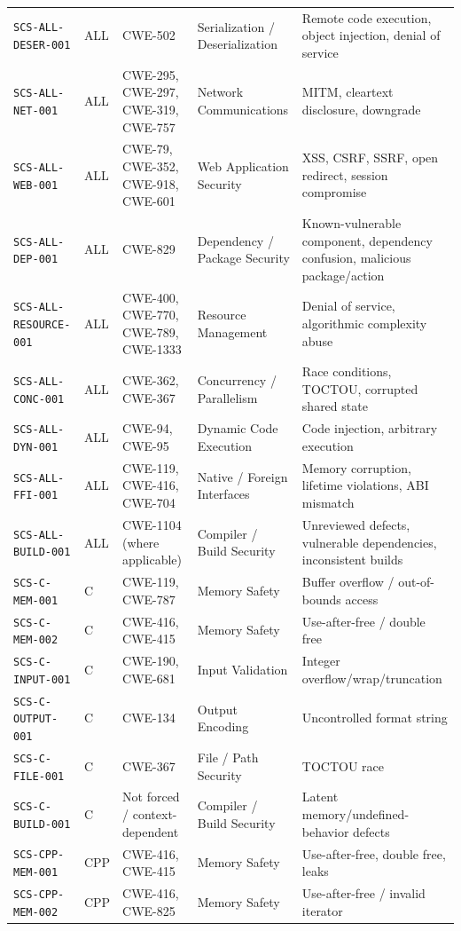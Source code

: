 \documentclass[10pt,letterpaper]{article}
\newcommand{\code}[1]{\begingroup\small\ttfamily\def\UrlFont{\ttfamily}\nolinkurl{#1}\endgroup}
\begin{document}
\begin{landscape}
\begin{longtable}{@{}P{1.3in}P{0.7in}P{1.4in}P{1.8in}P{3.8in}@{}}
\code{SCS-ALL-DESER-001} & ALL & CWE-502 & Serialization / Deserialization & Remote code execution, object injection, denial of service\\
\code{SCS-ALL-NET-001} & ALL & CWE-295, CWE-297, CWE-319, CWE-757 & Network Communications & MITM, cleartext disclosure, downgrade\\
\code{SCS-ALL-WEB-001} & ALL & CWE-79, CWE-352, CWE-918, CWE-601 & Web Application Security & XSS, CSRF, SSRF, open redirect, session compromise\\
\code{SCS-ALL-DEP-001} & ALL & CWE-829 & Dependency / Package Security & Known-vulnerable component, dependency confusion, malicious package/action\\
\code{SCS-ALL-RESOURCE-001} & ALL & CWE-400, CWE-770, CWE-789, CWE-1333 & Resource Management & Denial of service, algorithmic complexity abuse\\
\code{SCS-ALL-CONC-001} & ALL & CWE-362, CWE-367 & Concurrency / Parallelism & Race conditions, TOCTOU, corrupted shared state\\
\code{SCS-ALL-DYN-001} & ALL & CWE-94, CWE-95 & Dynamic Code Execution & Code injection, arbitrary execution\\
\code{SCS-ALL-FFI-001} & ALL & CWE-119, CWE-416, CWE-704 & Native / Foreign Interfaces & Memory corruption, lifetime violations, ABI mismatch\\
\code{SCS-ALL-BUILD-001} & ALL & CWE-1104 (where applicable) & Compiler / Build Security & Unreviewed defects, vulnerable dependencies, inconsistent builds\\
\code{SCS-C-MEM-001} & C & CWE-119, CWE-787 & Memory Safety & Buffer overflow / out-of-bounds access\\
\code{SCS-C-MEM-002} & C & CWE-416, CWE-415 & Memory Safety & Use-after-free / double free\\
\code{SCS-C-INPUT-001} & C & CWE-190, CWE-681 & Input Validation & Integer overflow/wrap/truncation\\
\code{SCS-C-OUTPUT-001} & C & CWE-134 & Output Encoding & Uncontrolled format string\\
\code{SCS-C-FILE-001} & C & CWE-367 & File / Path Security & TOCTOU race\\
\code{SCS-C-BUILD-001} & C & Not forced / context-dependent & Compiler / Build Security & Latent memory/undefined-behavior defects\\
\code{SCS-CPP-MEM-001} & CPP & CWE-416, CWE-415 & Memory Safety & Use-after-free, double free, leaks\\
\code{SCS-CPP-MEM-002} & CPP & CWE-416, CWE-825 & Memory Safety & Use-after-free / invalid iterator\\

\end{longtable}
\end{landscape}
\end{document}
